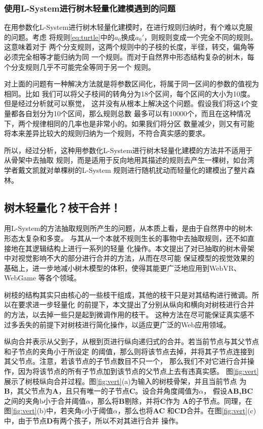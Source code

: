 \subsubsection{使用L-System进行树木轻量化建模遇到的问题}
在用参数化L-System进行树木轻量化建模时，在进行规则归纳时，有个难以克服的问题。考虑
将规则\ref{eq:turtle}中的$a_0$换成$a_0'$，则规则变成一个完全不同的规则。这意味着对于
两个分支规则，这两个规则中的子枝的长度，半径，转交，偏角等必须完全相等才能归纳为同
一个规则。而对于自然界中形态结构复杂的树木，每个分支规则几乎不可能完全等同于另一个
规则。

对上面的问题有一种解决方法就是将参数区间化，将属于同一区间的参数的值视为相同。比如
我们可以将父子枝间的转角分为18个区间，每个区间的大小为10度。但是经过分析就可以察觉，
这并没有从根本上解决这个问题。假设我们将这4个变量都各自划分为10个区间，那么规则总数
最多可以有10000个，而且在这种情况下，两个规律相同的几率也是非常小的。如果我们将分区
数量减少，则又有可能将本来差异比较大的规则归纳为一个规则，不符合真实感的要求。

所以，经过分析，这种用参数化L-System进行树木轻量化建模的方法并不适用于从骨架中去抽取
规则，而是适用于反向地用其描述的规则去产生一棵树，如台湾学者戴文凯就对单棵树的L-System
规则进行随机扰动而轻量化的建模出了整片森林。

\subsection{树木轻量化？枝干合并！}
\label{subsec:branchmerge}
用L-System的方法抽取规则所产生的问题，从本质上看，是由于自然界中的树木形态太复杂和多变。
与其从一个本就不规则生长的事物中去抽取规则，还不如直接地在其逻辑结构上进行一系列的轻量
化操作。本文提出了对已抽取的树木骨架中对视觉影响不大的部分进行合并的方法，从而在尽可能
保证模型的视觉效果的基础上，进一步地减小树木模型的体积，使得其能更广泛地应用到WebVR、WebGame
等各个领域。

树枝的结构其实只由核心的一些枝干组成，其他的枝干只是对其结构进行微调。所以在要求进一步轻量化
的前提下，本文提出了分别从纵向和横向对树枝进行合并的方法，以去掉一些只是起到微调作用的枝干。
这种方法在尽可能保证真实感不过多丢失的前提下对树枝进行简化操作，以适应更广泛的Web应用领域。

纵向合并表示从父到子，从根到页进行纵向递归式的合并。若当前节点与其父节点和子节点的夹角小于所设定
的阈值，那么则将该节点去掉，并将其子节点连接到其父节点。注意，若该节点的子节点数目不只一个，
那么我们不对它进行合并操作，因为将该节点的所有子节点加到该节点的父节点上去有违真实感。
图\ref{fig:vert}展示了树枝纵向合并过程。图\ref{fig:vert}(a)为输入的树枝骨架，并且当前节点
为\textbf{B}，其父节点为\textbf{A}，且只有唯一的子节点\textbf{C}。设合并角度阈值为$\alpha$，
假设\textbf{AB,BC}之间的夹角b小于合并阈值$\alpha$，那么将\textbf{B}剔除，并将\textbf{C}作为
\textbf{A}的子节点。同理，在图\ref{fig:vert}(b)中，若夹角c小于阈值$\alpha$，那么也将\textbf{AC}
和\textbf{CD}合并。在图\ref{fig:vert}(c)中，由于节点\textbf{D}有两个孩子，所以不对其进行合并
操作。


